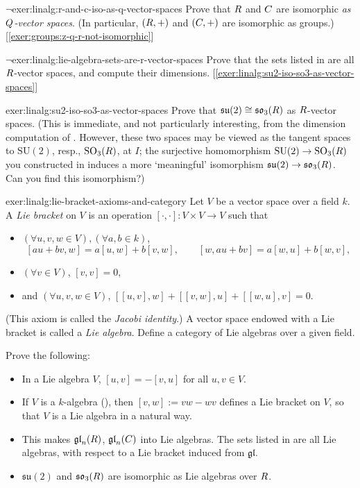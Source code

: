 \begin{exer}{$\lnot$}{exer:linalg:r-and-c-iso-as-q-vector-spaces}
  Prove that $R$ and $C$ are isomorphic \emph{as $Q$-vector
    spaces}. (In particular, $(R, +)$ and $(C, +)$ are isomorphic as
  groups.) [\ref{exer:groups:z-q-r-not-isomorphic}]
\end{exer}
\begin{exer}{$\lnot$}{exer:linalg:lie-algebra-sets-are-r-vector-spaces}
  Prove that the sets listed in  are all
  $R$-vector spaces, and compute their
  dimensions. [\ref{exer:linalg:su2-iso-so3-as-vector-spaces}]
\end{exer}
\begin{exer}{}{exer:linalg:su2-iso-so3-as-vector-spaces}
  Prove that $\mathfrak{su}(2) \cong \mathfrak{so}_3(R)$ as
  $R$-vector spaces. (This is immediate, and not particularly
  interesting, from the dimension computation of
  . However,
  these two spaces may be viewed as the tangent spaces to
  $\mathrm{SU}(2)$, resp., $\mathrm{SO}_3(R)$, at $I$; the surjective
  homomorphism $\mathrm{SU}(2) \to \mathrm{SO}_3(R)$ you constructed
  in  induces a more
  `meaningful' isomorphism $\mathfrak{su}(2) \to
  \mathfrak{so}_3(R)$. Can you find this isomorphism?)
\end{exer}
\begin{exer}{}{exer:linalg:lie-bracket-axioms-and-category}
  Let $V$ be a vector space over a field $k$. A \emph{Lie bracket} on
  $V$ is an operation $[\cdot,\cdot] : V \times V \to V$ such that
  \begin{itemize}
  \item $(\forall u,v,w \in V), (\forall a,b \in k)$,
    \[ [au+bv,w] = a[u,w]+b[v,w], \qquad [w,au+bv] = a[w,u]+b[w,v],
    \]
  \item $(\forall v \in V)$, $[v,v] = 0$,
  \item and $(\forall u,v,w \in V)$,
    $[[u,v],w] + [[v,w],u] + [[w,u],v] = 0$.
  \end{itemize}
  (This axiom is called the \emph{Jacobi identity}.) A vector space
  endowed with a Lie bracket is called a \emph{Lie algebra}. Define a
  category of Lie algebras over a given field.

  Prove the following:
  \begin{itemize}
  \item In a Lie algebra $V$, $[u,v] = -[v,u]$ for all $u,v \in V$.
  \item If $V$ is a $k$-algebra (), then
    $[v,w] := vw - wv$ defines a Lie bracket on $V$, so that $V$ is a
    Lie algebra in a natural way.
  \item This makes $\mathfrak{gl}_n(R)$, $\mathfrak{gl}_n(C)$ into
    Lie algebras. The sets listed in  are
    all Lie algebras, with respect to a Lie bracket induced from
    $\mathfrak{gl}$.
  \item $\mathfrak{su}(2)$ and $\mathfrak{so}_3(R)$ are isomorphic as
    Lie algebras over $R$.
  \end{itemize}
\end{exer}

